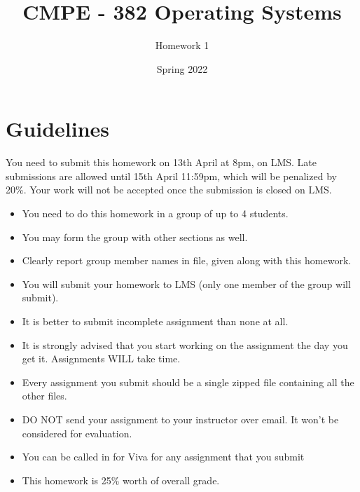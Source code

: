\documentclass[a4paper,12pt]{article}
\begin{document}
	
	\title{CMPE - 382 Operating Systems }
	\author{Homework 1}
	\date{Spring 2022}
	\maketitle
	\section*{Guidelines}
	
	You need to submit this homework on  {\color{blue}13th April at 8pm}, on LMS. Late submissions are allowed until {\color{red} 15th April 11:59pm}, which will be penalized by 20\%. Your work will not be accepted once the submission is closed on LMS.

	
	\begin{itemize}
		\item You need to do this homework in a group of up to 4 students. 
		\item You may form the group with other sections as well. 
		\item Clearly report group member names in  file, given along with this homework. 
		\item You will submit your homework to LMS (only one member of the group will submit).
		\item It is better to submit incomplete assignment than none at all.
		\item It is strongly advised that you start working on the assignment the day you get it. Assignments WILL take time.
		\item Every assignment you submit should be a single zipped file containing all the other files. 
		\item DO NOT send your assignment to your instructor over email. It won't be considered for evaluation. 
		\item You can be called in for Viva for any assignment that you submit
		\item This homework is 25\% worth of overall grade.
	\end{itemize}
	
	
	
\end{document}
